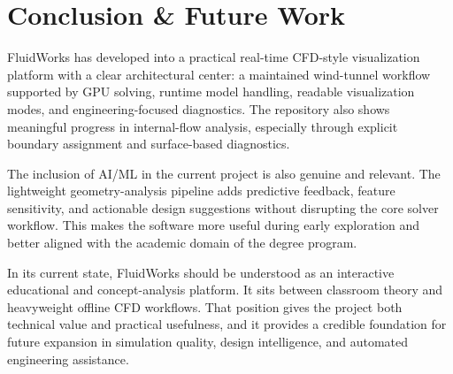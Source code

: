 \documentclass[12pt,a4paper,titlepage]{report}
\begin{document}
\chapter{Conclusion \& Future Work}
FluidWorks has developed into a practical real-time CFD-style visualization platform with a clear architectural center: a maintained wind-tunnel workflow supported by GPU solving, runtime model handling, readable visualization modes, and engineering-focused diagnostics. The repository also shows meaningful progress in internal-flow analysis, especially through explicit boundary assignment and surface-based diagnostics.

The inclusion of AI/ML in the current project is also genuine and relevant. The lightweight geometry-analysis pipeline adds predictive feedback, feature sensitivity, and actionable design suggestions without disrupting the core solver workflow. This makes the software more useful during early exploration and better aligned with the academic domain of the degree program.

In its current state, FluidWorks should be understood as an interactive educational and concept-analysis platform. It sits between classroom theory and heavyweight offline CFD workflows. That position gives the project both technical value and practical usefulness, and it provides a credible foundation for future expansion in simulation quality, design intelligence, and automated engineering assistance.
\end{document}

